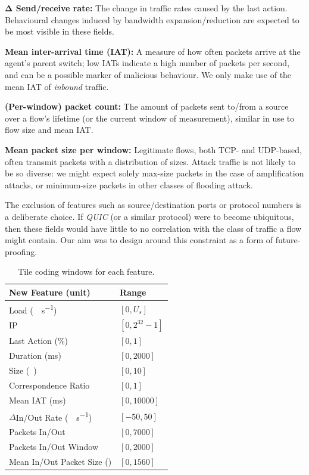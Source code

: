 \documentclass[10pt, times, comsoc]{IEEEtran}
\newcommand{\fakepara}[1]{\noindent\textbf{#1:}}
\begin{document}
\fakepara{$\mathbf{\Delta}$ Send/receive rate}
The change in traffic rates caused by the last action.
Behavioural changes induced by bandwidth expansion/reduction are expected to be most visible in these fields.

\fakepara{Mean inter-arrival time (IAT)}
A measure of how often packets arrive at the agent's parent switch; low IATs indicate a high number of packets per second, and can be a possible marker of malicious behaviour.
We only make use of the mean IAT of \emph{inbound} traffic.

\fakepara{(Per-window) packet count}
The amount of packets sent to/from a source over a flow's lifetime (or the current window of measurement), similar in use to flow size and mean IAT.

\fakepara{Mean packet size per window}
Legitimate flows, both TCP- and UDP-based, often transmit packets with a distribution of sizes.
Attack traffic is not likely to be so diverse: we might expect solely max-size packets in the case of amplification attacks, or minimum-size packets in other classes of flooding attack.

The exclusion of features such as source/destination ports or protocol numbers is a deliberate choice.
If \emph{QUIC} (or a similar protocol) were to become ubiquitous, then these fields would have little to no correlation with the class of traffic a flow might contain.
Our aim was to design around this constraint as a form of future-proofing.

\begin{table}
	\centering
	\caption{Tile coding windows for each feature.\label{tab:codings}}
	
	\begin{tabular}{@{}ll@{}}
		\toprule
		New Feature (unit) & Range \\
		\midrule
		Load (\si{\mega\bit\per\second}) & $[0, U_s]$ \\
		IP & $[0, 2^{32}-1]$ \\
		Last Action (\si{\percent}) & $[0, 1]$ \\
		Duration (\si{\milli\second}) & $[0, \num{2000}]$ \\
		Size (\si{\mebi\byte}) & $[0,10]$ \\
		Correspondence Ratio & $[0,1]$ \\
		Mean IAT (\si{\milli\second}) & $[0, \num{10000}]$ \\
		$\Delta$In/Out Rate (\si{\mega\bit\per\second}) & $[-50, 50]$ \\
		Packets In/Out & $[0, 7000]$ \\
		Packets In/Out Window & $[0, 2000]$ \\
		Mean In/Out Packet Size (\si{\byte}) & $[0, 1560]$ \\
		\bottomrule
	\end{tabular}
\end{table}
\end{document}
